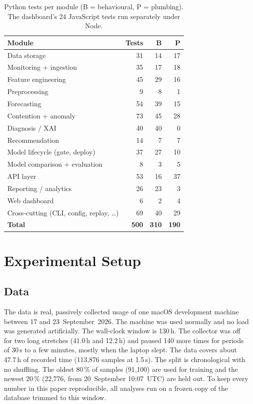 \documentclass[conference]{IEEEtran}
\begin{document}
\begin{table}[t]
\centering
\caption{Python tests per module (B = behavioural, P = plumbing). The
dashboard's 24 JavaScript tests run separately under Node.}
\label{tab:modules}
\begin{tabular}{@{}lrrr@{}}
\toprule
Module & Tests & B & P \\
\midrule
Data storage & 31 & 14 & 17 \\
Monitoring + ingestion & 35 & 17 & 18 \\
Feature engineering & 45 & 29 & 16 \\
Preprocessing & 9 & 8 & 1 \\
Forecasting & 54 & 39 & 15 \\
Contention + anomaly & 73 & 45 & 28 \\
Diagnosis / XAI & 40 & 40 & 0 \\
Recommendation & 14 & 7 & 7 \\
Model lifecycle (gate, deploy) & 37 & 27 & 10 \\
Model comparison + evaluation & 8 & 3 & 5 \\
API layer & 53 & 16 & 37 \\
Reporting / analytics & 26 & 23 & 3 \\
Web dashboard & 6 & 2 & 4 \\
Cross-cutting (CLI, config, replay, \dots) & 69 & 40 & 29 \\
\midrule
\textbf{Total} & \textbf{500} & \textbf{310} & \textbf{190} \\
\bottomrule
\end{tabular}
\end{table}

\section{Experimental Setup}\label{sec:setup}

\subsection{Data}
The data is real, passively collected usage of one macOS development machine
between 17 and 23~September~2026. The machine was used normally and no load was
generated artificially. The wall-clock window is 130\,h. The collector was off
for two long stretches (41.0\,h and 12.2\,h) and paused 140 more times for
periods of 30\,s to a few minutes, mostly when the laptop slept. The data covers
about 47.7\,h of recorded time (113{,}876 samples at 1.5\,s). The split is
chronological with no shuffling. The oldest 80\,\% of samples (91{,}100) are
used for training and the newest 20\,\% (22{,}776, from 20~September
10:07~UTC) are held out. To keep every number in this paper reproducible, all
analyses run on a frozen copy of the database trimmed to this window.
\end{document}
